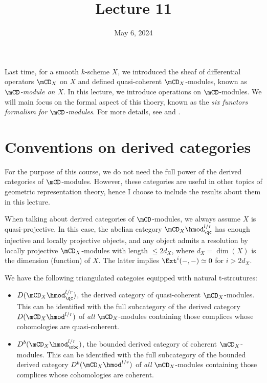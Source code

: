 





\title{Lecture 11}

\date{May 6, 2024}

\maketitle

	Last time, for a smooth $k$-scheme $X$, we introduced the sheaf of differential operators $\mCD_X$ on $X$ and defined quasi-coherent $\mCD_X$-modules, known as \emph{$\mCD$-module on $X$}. In this lecture, we introduce operations on $\mCD$-modules. We will main focus on the formal aspect of this thoery, known as the \emph{six functors formalism for $\mCD$-modules}. For more details, see \cite{B} and \cite{HTT}.

\section{Conventions on derived categories}

	For the purpose of this course, we do not need the full power of the derived categories of $\mCD$-modules. However, these categories are useful in other topics of geometric representation theory, hence I choose to include the results about them in this lecture. 

	When talking about derived categories of $\mCD$-modules, we always assume $X$ is quasi-projective. In this case, the abelian category $\mCD_X\hmod_\qc^{l/r}$ has enough injective and locally projective objects, and any object admits a resolution by locally projective $\mCD_X$-modules with length $\le 2d_X$, where $d_X=\dim(X)$ is the dimension (function) of $X$. The latter implies $\Ext^i(-,-)\simeq 0$ for $i>2d_X$.

	We have the following triangulated categoies equipped with natural t-strcutures:
	\begin{itemize}
		\item 
			$D(\mCD_X\hmod_\qc^{l/r})$, the derived category of quasi-coherent $\mCD_X$-modules. This can be identified with the full subcategory of the derived category $D(\mCD_X\hmod^{l/r})$ of \emph{all} $\mCD_X$-modules containing those complices whose cohomologies are quasi-coherent.
		\item
			 $D^b(\mCD_X\hmod_\mbc^{l/r})$, the bounded derived category of coherent $\mCD_X$-modules. This can be identified with the full subcategory of the bounded derived category $D^b(\mCD_X\hmod^{l/r})$ of \emph{all} $\mCD_X$-modules containing those complices whose cohomologies are coherent.
	\end{itemize}

